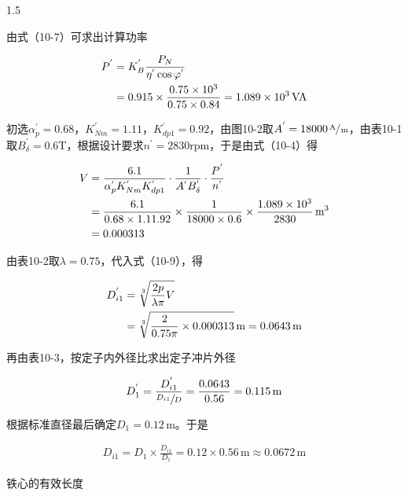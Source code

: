 \documentclass[a4paper,11pt]{ctexart}
\newcommand{\A}{\,\text{A}}
\newcommand{\VA}{\,\text{VA}}
\newcommand{\m}{\,\text{m}}
\newcommand{\rpm}{\text{rpm}}
\newcommand{\T}{\text{T}}
\newenvironment{shrinkeq}[2]
{
	\bgroup
	\addtolength\abovedisplayshortskip{#1}
	\addtolength\abovedisplayskip{#1}
	\addtolength\belowdisplayshortskip{#2}
	\addtolength\belowdisplayskip{#2}
}
{
	\egroup
	\ignorespacesafterend
}
\begin{document}
\begin{spacing}{1.5}
\par
由式（10-7）可求出计算功率
\begin{shrinkeq}{-1ex}{-1ex}
	\begin{align}
	P^{'} &= K_{B}^{'}\frac{P_N}{\eta^{'}\cos\varphi^{'}} \\
	&= 0.915\times\frac{0.75\times 10^3}{0.75\times 0.84} = 1.089\times 10^3 \VA\notag
	\end{align}
\end{shrinkeq}
\par
初选$\alpha_{p}^{'} = 0.68$，$K_{Nm}^{'} = 1.11$，$K_{dp1}^{'} = 0.92$，由图10-2取$A^{'} =18000\sfrac{\A}{\m}$，由表10-1取$B_{\delta}^{'} = 0.6\T$，根据设计要求$n^{'}=2830\rpm$，于是由式（10-4）得
\begin{shrinkeq}{-1ex}{-1ex}
	\begin{align}
	V &= \frac{6.1}{\alpha_{p}^{'}K_{Nm}^{'}K_{dp1}^{'}}\cdot\frac{1}{A^{'}B_{\delta}^{'}}\cdot\frac{P^{'}}{n^{'}} \\
	&=\frac{6.1}{0.68\times 1.11\time 0.92}\times\frac{1}{18000\times 0.6}\times\frac{1.089\times 10^3}{2830}\m^3 \notag\\
	&=0.000313 \notag
	\end{align}
\end{shrinkeq}
\par
由表10-2取$\lambda = 0.75$，代入式（10-9），得
\begin{shrinkeq}{-1ex}{-1ex}
	\begin{align}
	D_{i1}^{'} &= \sqrt[3]{\frac{2p}{\lambda\pi}V} \\
	&=\sqrt[3]{\frac{2}{0.75\pi}\times 0.000313}\m = 0.0643\m \notag
	\end{align}
\end{shrinkeq}
再由表10-3，按定子内外径比求出定子冲片外径
\begin{shrinkeq}{-1ex}{-1ex}
	\begin{align}
	D_{1}^{'} = \frac{D_{i1}^{'}}{\sfrac{D_{i1}}{D}} = \frac{0.0643}{0.56}  = 0.115\m
	\end{align}
\end{shrinkeq}
\par
根据标准直径最后确定$D_1 = 0.12\m$。于是
\begin{shrinkeq}{-1ex}{-1ex}
	\begin{align}
	D_{i1} = D_1\times\frac{D_{i1}}{D_1} = 0.12\times 0.56\m  \approx 0.0672\m
	\end{align}
\end{shrinkeq}
\par
铁心的有效长度
\begin{shrinkeq}{-1ex}{-1ex}

\end{shrinkeq}
\end{spacing}
\end{document}
